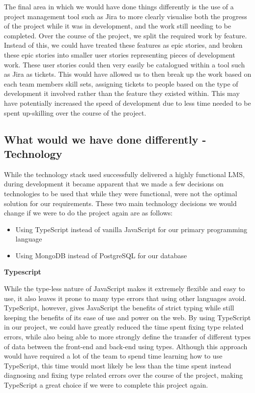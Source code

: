 The final area in which we would have done things differently is the use of a project management tool such as Jira to more clearly visualise both the progress of the project while it was in development, and the work still needing to be completed. Over the course of the project, we split the required work by feature. Instead of this, we could have treated these features as epic stories, and broken these epic stories into smaller user stories representing pieces of development work. These user stories could then very easily be catalogued within a tool such as Jira as tickets. This would have allowed us to then break up the work based on each team members skill sets, assigning tickets to people based on the type of development it involved rather than the feature they existed within. This may have potentially increased the speed of development due to less time needed to be spent up-skilling over the course of the project.


\subsection{What would we have done differently - Technology}
While the technology stack used successfully delivered a highly functional LMS, during development it became apparent that we made a few decisions on technologies to be used that while they were functional, were not the optimal solution for our requirements. These two main technology decisions we would change if we were to do the project again are as follows:

\begin{itemize}
    \item Using TypeScript instead of vanilla JavaScript for our primary programming language
    \item Using MongoDB instead of PostgreSQL for our database
\end{itemize}

\textbf{Typescript}

While the type-less nature of JavaScript makes it extremely flexible and easy to use, it also leaves it prone to many type errors that using other languages avoid. TypeScript, however, gives JavaScript the benefits of strict typing while still keeping the benefits of its ease of use and power on the web. By using TypeScript in our project, we could have greatly reduced the time spent fixing type related errors, while also being able to more strongly define the transfer of different types of data between the front-end and back-end using types. Although this approach would have required a lot of the team to spend time learning how to use TypeScript, this time would most likely be less than the time spent instead diagnosing and fixing type related errors over the course of the project, making TypeScript a great choice if we were to complete this project again.

